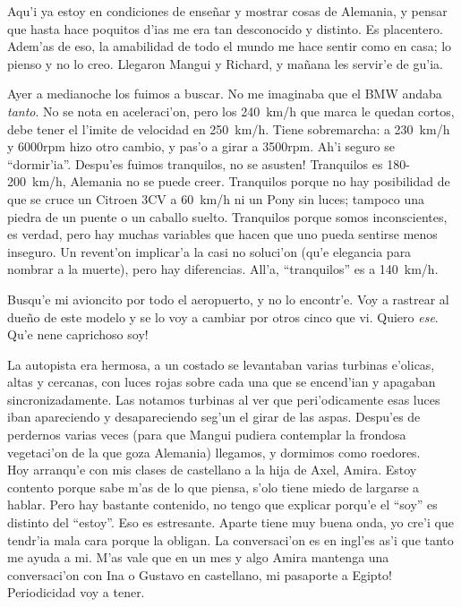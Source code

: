 Aqu'i ya estoy en condiciones de ense\~nar y mostrar cosas de Alemania, y pensar
que hasta hace poquitos d'ias me era tan desconocido y distinto. Es
placentero. Adem'as de eso, la amabilidad de todo el mundo me hace sentir como
en casa; lo pienso y no lo creo. Llegaron Mangui y Richard, y ma\~nana les
servir'e de gu'ia.

Ayer a medianoche los fuimos a buscar. No me imaginaba que el {\small BMW}
andaba \emph{tanto}. No se nota en aceleraci'on, pero los 240~km/h que marca le
quedan cortos, debe tener el l'imite de velocidad en 250~km/h. Tiene
sobremarcha: a 230~km/h y 6000rpm hizo otro cambio, y pas'o a girar a 3500rpm.
Ah'i seguro se ``dormir'ia''. Despu'es fuimos tranquilos, \textexclamdown no se
asusten! Tranquilos es 180-200~km/h, Alemania no se puede creer. Tranquilos
porque no hay posibilidad de que se cruce un Citroen 3{\small CV} a 60~km/h ni
un Pony sin luces; tampoco una piedra de un puente o un caballo suelto.
Tranquilos porque somos inconscientes, es verdad, pero hay muchas variables que
hacen que uno pueda sentirse menos inseguro. Un revent'on implicar'a la casi no
soluci'on (qu'e elegancia para nombrar a la muerte), pero hay diferencias.
All'a, ``tranquilos'' es a 140~km/h.

Busqu'e mi avioncito por todo el aeropuerto, y no lo encontr'e. Voy a rastrear
al due\~no de este modelo y se lo voy a cambiar por otros cinco que vi. Quiero
\emph{ese}. \textexclamdown Qu'e nene caprichoso soy!

La autopista era hermosa, a un costado se levantaban varias turbinas e'olicas,
altas y cercanas, con luces rojas sobre cada una que se encend'ian y apagaban
sincronizadamente. Las notamos turbinas al ver que peri'odicamente esas luces
iban apareciendo y desapareciendo seg'un el girar de las aspas. Despu'es de
perdernos varias veces (para que Mangui pudiera contemplar la frondosa
vegetaci'on de la que goza Alemania) llegamos, y dormimos como roedores.\\

Hoy arranqu'e con mis clases de castellano a la hija de Axel, Amira. Estoy
contento porque sabe m'as de lo que piensa, s'olo tiene miedo de largarse a
hablar. Pero hay bastante contenido, no tengo que explicar porqu'e el ``soy'' es
distinto del ``estoy''. Eso es estresante. Aparte tiene muy buena onda, yo cre'i
que tendr'ia mala cara porque la obligan. La conversaci'on es en ingl'es as'i
que tanto me ayuda a mi. M'as vale que en un mes y algo Amira mantenga una
conversaci'on con Ina o Gustavo en castellano, \textexclamdown mi pasaporte a
Egipto! Periodicidad voy a tener.\\

